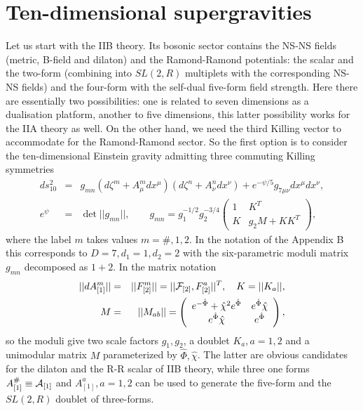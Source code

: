 \documentclass[a4paper,12pt]{article}
\begin{document}
\section{ Ten-dimensional supergravities}
Let us start with the IIB theory. Its bosonic sector contains
the NS-NS fields (metric, B-field and dilaton) and the
Ramond-Ramond potentials: the scalar and the two-form
(combining into $SL(2,R)$ multiplets with the corresponding
NS-NS fields) and the four-form with the self-dual five-form
field strength. Here there are essentially two possibilities:
one is related to seven dimensions as a dualisation platform,
another to five dimensions, this latter possibility works for
the IIA theory as well. On the other hand, we need the third
Killing vector to accommodate for the Ramond-Ramond sector. So
the first option is to consider the ten-dimensional Einstein
gravity admitting three commuting Killing symmetries
\begin{eqnarray}
ds_{10}^2 &=& g_{mn} \left( d\zeta^m + A^m_{\mu} dx^\mu \right)
\left( d\zeta^n + A^n_{\nu} dx^\nu \right) + e^{-\psi/5}
g_{7\mu\nu} dx^\mu dx^\nu, \label{hab10}\\
e^\psi &=& \det ||g_{mn}||, \qquad g_{mn} = g_1^{-1/2}
g_2^{-3/4} \left( \begin{array}{cc} 1 & K^T \\
  K & g_2M+KK^T \end{array} \right), \nonumber
\end{eqnarray}
where the label $m$ takes values $m=\#,1,2$. In the notation of
the Appendix B this corresponds to $D=7,d_1=1,d_2=2$ with the
six-parametric moduli matrix $g_{mn}$ decomposed as $1+2$. In the
matrix notation
\begin{eqnarray}\label{10-2}
||dA^m_{[1]}|| &=& ||F^m_{[2]}|| = ||{\cal F}_{[2]},F^a_{[2]}||^T,
\quad K = ||K_a||, \nonumber \\
M &=& ||M_{ab}|| = \left( \begin{array}{cc}
  e^{-\hat\Phi}+\hat\chi^2e^{\hat\Phi} & e^{\hat\Phi}\hat\chi \\
  e^{\hat\Phi}\hat\chi & e^{\hat\Phi} \end{array} \right),
\end{eqnarray}
so the moduli give two scale factors $g_1, g_2$, a doublet $K_a,
a=1,2$ and a unimodular matrix $M$ parameterized by
$\hat\Phi,\hat\chi$. The latter are obvious candidates for the
dilaton and the R-R scalar of IIB theory, while three one forms
$A^\#_{[1]} \equiv {\cal A}_{[1]}$ and $A^a_{[1]}, a=1,2$ can
be used to generate the five-form and the $SL(2,R)$ doublet of
three-forms.
\end{document}
